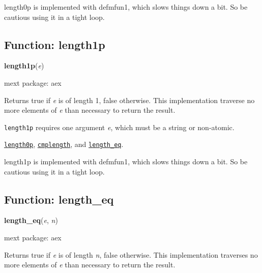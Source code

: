 \documentclass[]{article}
\begin{document}
\vspace{5 pt}


length0p is implemented with defmfun1, which slows things down a bit. So be cautious using it in a tight loop. 

\vspace{5 pt}


\subsection{Function: length1p\label{sec:length1p}}
\hypertarget{length1p}{}
{\bf length1p}({\it e})


\noindent mext package: aex



\vspace{5 pt}
Returns true if {\it e} is of length 1, false otherwise. This implementation traverse no more elements of {\it e} than necessary to return the result. 

\vspace{5 pt}

   {\tt length1p} requires one argument {\it e}, which must be a string or non-atomic.


\vspace{5 pt}


  \hyperlink{length0p}{{\tt length0p}}, \hyperlink{cmplength}{{\tt cmplength}}, and \hyperlink{length_eq}{{\tt length\_eq}}.

\vspace{5 pt}


length1p is implemented with defmfun1, which slows things down a bit. So be cautious using it in a tight loop. 

\vspace{5 pt}


\subsection{Function: length\_eq\label{sec:length_eq}}
\hypertarget{length_eq}{}
{\bf length\_eq}({\it e}, {\it n})


\noindent mext package: aex



\vspace{5 pt}
Returns true if {\it e} is of length {\it n}, false otherwise. This implementation traverses no more elements of {\it e} than necessary to return the result. 
\end{document}
